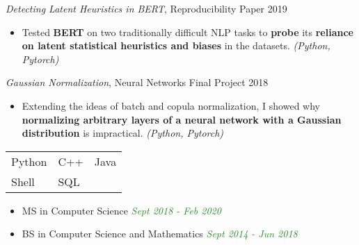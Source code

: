 \documentclass[a4paper,12pt]{memoir}
\begin{document}

\CVItem
	{\textit{Detecting Latent Heuristics in BERT}, Reproducibility Paper \hfill 2019}
	{
		\begin{itemize}
			\item Tested \textbf{BERT} on two traditionally difficult NLP tasks to \textbf{probe} its \textbf{reliance on latent statistical heuristics and biases} in the datasets. \textit{(Python, Pytorch)}
		\end{itemize}
	}

\CVItem
	{\textit{Gaussian Normalization}, Neural Networks Final Project \hfill 2018}
	{
		\begin{itemize}
			\item Extending the ideas of batch and copula normalization, I showed why \textbf{normalizing arbitrary layers of a neural network with a Gaussian distribution} is impractical. \textit{(Python, Pytorch)}
		\end{itemize}
	}
\Sep



{
	\begin{tabular}{p{} p{} p{}}
		\bluebullet Python &  \bluebullet C++ & \bluebullet Java\\
		\bluebullet Shell &  \bluebullet SQL\\
	\end{tabular}
}

\Sep



{
	\begin{itemize}
		\item MS in Computer Science \hfill \textcolor{ForestGreen}{\textit{Sept 2018 - Feb 2020}} \\
		\item BS in Computer Science and Mathematics \hfill \textcolor{ForestGreen}{\textit{Sept 2014 - Jun 2018}}
	\end{itemize}
}
\end{document}
